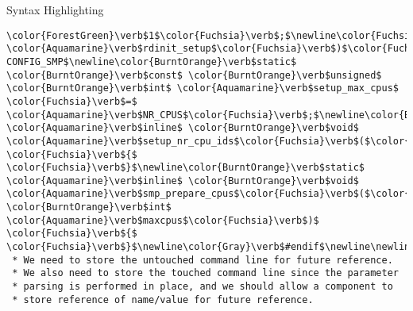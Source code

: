 \begin{frame}{Syntax Highlighting}
\begin{verbatim}
\color{ForestGreen}\verb$1$\color{Fuchsia}\verb$;$\newline\color{Fuchsia}\verb$}$\newline\color{Aquamarine}\verb$__setup$\color{Fuchsia}\verb$($\color{Emerald}\verb$"rdinit="$\color{Fuchsia}\verb$,$ \color{Aquamarine}\verb$rdinit_setup$\color{Fuchsia}\verb$)$\color{Fuchsia}\verb$;$\newline\newline\color{Gray}\verb$#ifndef CONFIG_SMP$\newline\color{BurntOrange}\verb$static$ \color{BurntOrange}\verb$const$ \color{BurntOrange}\verb$unsigned$ \color{BurntOrange}\verb$int$ \color{Aquamarine}\verb$setup_max_cpus$ \color{Fuchsia}\verb$=$ \color{Aquamarine}\verb$NR_CPUS$\color{Fuchsia}\verb$;$\newline\color{BurntOrange}\verb$static$ \color{Aquamarine}\verb$inline$ \color{BurntOrange}\verb$void$ \color{Aquamarine}\verb$setup_nr_cpu_ids$\color{Fuchsia}\verb$($\color{BurntOrange}\verb$void$\color{Fuchsia}\verb$)$ \color{Fuchsia}\verb${$ \color{Fuchsia}\verb$}$\newline\color{BurntOrange}\verb$static$ \color{Aquamarine}\verb$inline$ \color{BurntOrange}\verb$void$ \color{Aquamarine}\verb$smp_prepare_cpus$\color{Fuchsia}\verb$($\color{BurntOrange}\verb$unsigned$ \color{BurntOrange}\verb$int$ \color{Aquamarine}\verb$maxcpus$\color{Fuchsia}\verb$)$ \color{Fuchsia}\verb${$ \color{Fuchsia}\verb$}$\newline\color{Gray}\verb$#endif$\newline\newline\color{Rhodamine}\begin{verbatim}/*
 * We need to store the untouched command line for future reference.
 * We also need to store the touched command line since the parameter
 * parsing is performed in place, and we should allow a component to
 * store reference of name/value for future reference.

\end{verbatim}
\end{frame}
